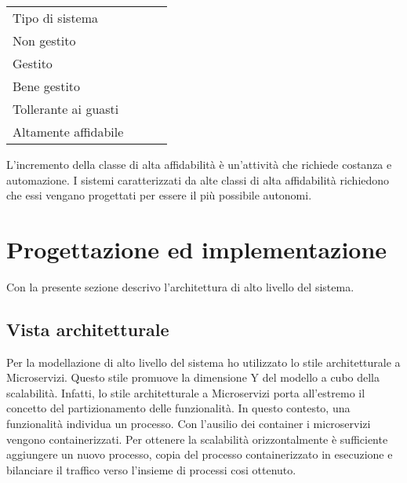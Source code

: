 \begin{center}
\begin{tabular}
		{l||p{5cm}||p{2cm}||p{2cm}}	
		\arrayrulecolor{white}
		\rowcolor{glaucous}	
		Tipo di sistema &  
		\makebox[5cm][c]{Disservizio (minuti per anno) } & 	
		\makebox[2cm][c]{Affidabilità} & 
		\makebox[2cm][c]{Classe} \\ 
		\rowcolor{lightcornflowerblue}
		Non gestito & 
		\makebox[5cm][c]{50000} & 
		\makebox[2cm][c]{90}  & 
		\makebox[2cm][c]{1} \\
		\rowcolor{moonstoneblue}
		Gestito & 
		\makebox[5cm][c]{5000} & 
		\makebox[2cm][c]{99} & 
		\makebox[2cm][c]{2} \\
		\rowcolor{lightcornflowerblue}
		Bene gestito & 
		\makebox[5cm][c]{500} & 
		\makebox[2cm][c]{99.9} & 
		\makebox[2cm][c]{3} \\
		\rowcolor{moonstoneblue}
		Tollerante ai guasti & 
		\makebox[5cm][c]{50} & 
		\makebox[2cm][c]{99.99} & 
		\makebox[2cm][c]{4} \\
		\rowcolor{lightcornflowerblue}
		Altamente affidabile & 
		\makebox[5cm][c]{5} & 
		\makebox[2cm][c]{99.999} & 
		\makebox[2cm][c]{5} \\
\end{tabular}		  
\end{center}

L'incremento della classe di alta affidabilità è 
un'attività  che richiede costanza e automazione.
I sistemi caratterizzati da alte classi di alta
affidabilità richiedono che essi vengano progettati 
per essere il più possibile autonomi.

\section{Progettazione ed implementazione}
Con la presente sezione descrivo l'architettura di alto
livello del sistema.

\subsection{Vista architetturale}
Per la modellazione di alto livello del sistema ho utilizzato 
lo stile architetturale a Microservizi. Questo stile promuove
la dimensione Y del modello a cubo della scalabilità. Infatti, 
lo stile architetturale a Microservizi porta all'estremo 
il concetto del partizionamento delle funzionalità.
In questo contesto, una funzionalità individua un processo.
Con l'ausilio dei container i microservizi vengono containerizzati.
Per ottenere la scalabilità orizzontalmente è sufficiente aggiungere un nuovo 
processo, copia del processo containerizzato in esecuzione e 
bilanciare il traffico verso l'insieme di processi cosi ottenuto.

